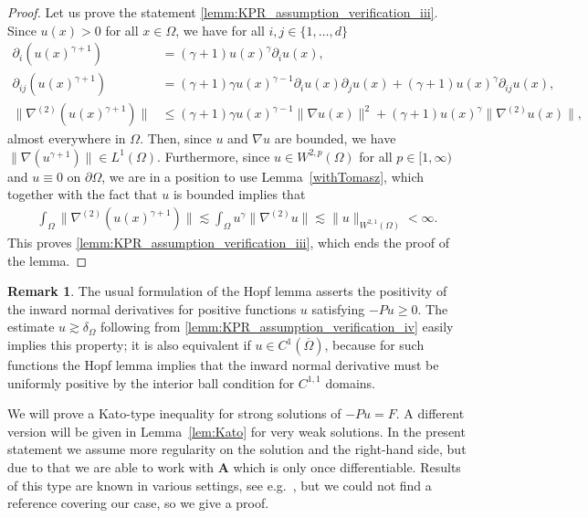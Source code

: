 \documentclass[12pt,a4paper]{amsart}
\theoremstyle{definition}
\newtheorem{remark}[theorem]{\bf Remark}
\newcommand{\A}{\mathbf{A}}
\begin{document}
\begin{proof}
Let us prove the statement \ref{lemm:KPR_assumption_verification_iii}.
Since $u(x)>0$ for all $x\in \Omega$, we have for all $i,j\in \{ 1,\dots, d\}$
\begin{align}\label{oszac-pierwsza-poch}\partial_{i}(u(x)^{\gamma+1})&= (\gamma+1)u(x)^\gamma \partial_i u(x),\\
\label{oszac-druga-poch}
    \partial_{ij} (u(x)^{\gamma+1}) &= (\gamma+1)\gamma u(x)^{\gamma-1} \partial_i u(x) \partial_j u(x) + (\gamma+1)u(x)^\gamma \partial_{ij}u(x),\\
\label{oszac-norm-druga-poch}
 \|\nabla^{(2)} (u(x)^{\gamma+1})\| &\le  (\gamma+1)\gamma u(x)^{\gamma-1} \|\nabla u(x)\|^2 + (\gamma+1)u(x)^\gamma  \|\nabla^{(2)} u(x)\|,
\end{align}
almost everywhere in $\Omega$. Then, since $u$ and $\nabla u$ are bounded, we have $\|\nabla(u^{\gamma+1})\|\in L^1(\Omega)$. Furthermore, since $u\in W^{2,p}(\Omega)$ for all $p\in [1,\infty)$ and $u\equiv 0$ on $\partial \Omega$, we are in a position to use Lemma~\ref{withTomasz}, which together with the fact that $u$ is bounded implies that 
\begin{align*}
   \int_\Omega  \|\nabla^{(2)} (u(x)^{\gamma+1})\| \lesssim \int_\Omega u^\gamma  \|\nabla^{(2)} u\| \lesssim \|u\|_{W^{2,1}(\Omega)}<\infty.
\end{align*}
This proves \ref{lemm:KPR_assumption_verification_iii}, which ends the proof of the lemma.
\end{proof}
\begin{remark}
\label{hopf-lem}
The usual formulation of the Hopf lemma asserts the positivity of the inward normal derivatives for positive functions $u$ satisfying $-Pu\geq 0$. The estimate $u\gtrsim \delta_\Omega$ following from \ref{lemm:KPR_assumption_verification_iv} easily implies this property; it is also equivalent if $u\in C^1(\overline{\Omega})$, because for such functions the Hopf lemma implies that the inward normal derivative must be uniformly positive by the interior ball condition for $C^{1,1}$ domains.
\end{remark}

We will prove a Kato-type inequality for strong solutions of $-Pu = F$. A different version will be given in Lemma~\ref{lem:Kato} for very weak solutions. In the present statement we assume more regularity on the solution and the right-hand side, but due to that we are able to work with $\A$ which is only once differentiable. Results of this type are known in various settings, see e.g.~\cite{MR4651280}, but we could not find a reference covering our case, so we give a proof. 
\end{document}
